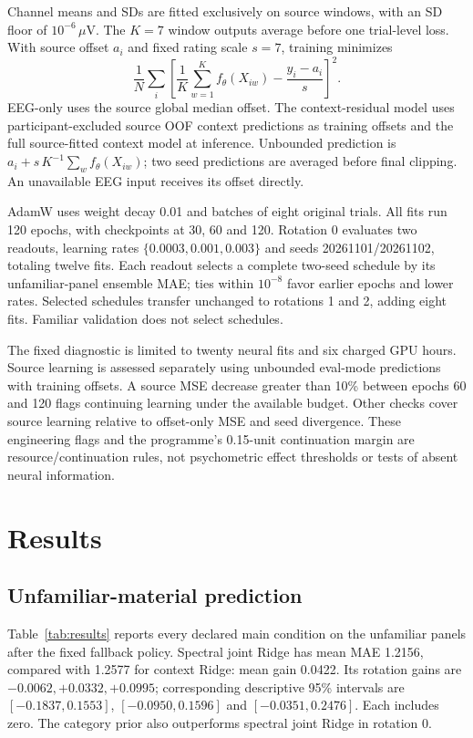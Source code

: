 \documentclass[conference]{IEEEtran}
\begin{document}
Channel means and SDs are fitted exclusively on source windows, with an SD floor of \(10^{-6}\,\mu\mathrm{V}\). The \(K=7\) window outputs average before one trial-level loss. With source offset \(a_i\) and fixed rating scale \(s=7\), training minimizes
\begin{equation}
\frac{1}{N}\sum_i
\left[
\frac{1}{K}\sum_{w=1}^{K} f_\theta(X_{iw})
-\frac{y_i-a_i}{s}
\right]^2.
\end{equation}
EEG-only uses the source global median offset. The context-residual model uses participant-excluded source OOF context predictions as training offsets and the full source-fitted context model at inference. Unbounded prediction is \(a_i+s\,K^{-1}\sum_w f_\theta(X_{iw})\); two seed predictions are averaged before final clipping. An unavailable EEG input receives its offset directly.

AdamW uses weight decay 0.01 and batches of eight original trials. All fits run 120 epochs, with checkpoints at 30, 60 and 120. Rotation 0 evaluates two readouts, learning rates \(\{0.0003,0.001,0.003\}\) and seeds 20261101/20261102, totaling twelve fits. Each readout selects a complete two-seed schedule by its unfamiliar-panel ensemble MAE; ties within \(10^{-8}\) favor earlier epochs and lower rates. Selected schedules transfer unchanged to rotations 1 and 2, adding eight fits. Familiar validation does not select schedules.

The fixed diagnostic is limited to twenty neural fits and six charged GPU hours. Source learning is assessed separately using unbounded eval-mode predictions with training offsets. A source MSE decrease greater than 10\% between epochs 60 and 120 flags continuing learning under the available budget. Other checks cover source learning relative to offset-only MSE and seed divergence. These engineering flags and the programme's 0.15-unit continuation margin are resource/continuation rules, not psychometric effect thresholds or tests of absent neural information.

\section{Results}
\subsection{Unfamiliar-material prediction}
Table~\ref{tab:results} reports every declared main condition on the unfamiliar panels after the fixed fallback policy. Spectral joint Ridge has mean MAE 1.2156, compared with 1.2577 for context Ridge: mean gain 0.0422. Its rotation gains are \(-0.0062,+0.0332,+0.0995\); corresponding descriptive 95\% intervals are \([-0.1837,0.1553]\), \([-0.0950,0.1596]\) and \([-0.0351,0.2476]\). Each includes zero. The category prior also outperforms spectral joint Ridge in rotation 0.
\end{document}
